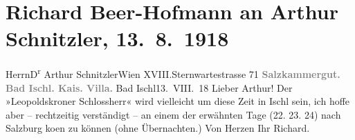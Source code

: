 

         
         \renewcommand{\erwaehntePersonen}{Personen: Max Reinhardt}
         \renewcommand{\erwaehnteOrte}{Orte: Bad Ischl, Kaiservilla, Salzburg, Salzburg-Leopoldskron, Salzkammergut, Sternwartestraße, Wien, XVIII., Währing}
         \renewcommand{\erwaehnteWerke}{}
               \section[Richard Beer-Hofmann an Arthur Schnitzler, 13. 8. 1918]{ Richard Beer-Hofmann an Arthur Schnitzler, 13. 8. 1918}\nopagebreak{}\rehead{ }\begin{ledgroupsized}[t]{13cm}\normalsize\beginnumbering \toendnotes[C]{\smallbreak\pagebreak[2]} 
\toendnotes[C]{\smallbreak}\pstart{}{\pb}Herrn\pend{}\pstart{}D\textsuperscript{r} Arthur Schnitzler\pend{}\pstart{}Wien XVIII.\pend{}\pstart{}Sternwartestrasse 71\pend{}{\bigskip}\pstart
           \noindent{}\centering{}{\pb}\textcolor{gray}{\textbf{Salzkammergut. Bad Ischl. Kais.
                        Villa.}}\pend
           \pstart
           \raggedleft{}{\pb}Bad Ischl13. VIII. 18\pend
           \pstart
           Lieber Arthur! Der »Leopoldskroner Schlossherr« wird
               vielleicht um diese Zeit in Ischl sein, ich hoffe
               aber – rechtzeitig verständigt – an einem der erwähnten Tage (22.{ }23.{ }24) nach Salzburg ko{\geminationm}en zu können (ohne Übernachten.) Von Herzen Ihr\pend
           \pstart \spacefill\mbox{Richard.}\pend{}
         
         \endnumbering{}\end{ledgroupsized}  \newcommand{\dateiname}{L02296}\newcommand{\titel}{Richard Beer-Hofmann an Arthur Schnitzler, 13. 8. 1918}\newcommand{\editorInnen}{Martin Anton Müller und Gerd-Hermann Susen}
      